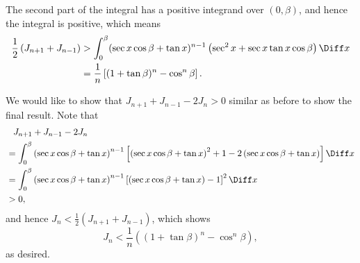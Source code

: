 \begin{enumerate}
          The second part of the integral has a positive integrand over \((0, \beta)\), and hence the integral is positive, which means
          \begin{align*}
              \frac{1}{2} \left(J_{n + 1} + J_{n - 1}\right) & > \int_{0}^{\beta} (\sec x \cos \beta + \tan x)^{n - 1} \left(\sec^2 x + \sec x \tan x \cos \beta\right) \Diff x \\
                                                             & = \frac{1}{n} \left[(1 + \tan \beta)^n - \cos^n \beta\right].
          \end{align*}

          We would like to show that \(J_{n + 1} + J_{n - 1} - 2 J_{n} > 0\) similar as before to show the final result. Note that
          \begin{align*}
               & \phantom{=} J_{n + 1} + J_{n - 1} - 2 J_{n}                                                                                                                                       \\
               & = \int_{0}^{\beta} \left(\sec x \cos \beta + \tan x\right)^{n - 1} \left[\left(\sec x \cos \beta + \tan x\right)^2 + 1 - 2 \left(\sec x \cos \beta + \tan x\right)\right] \Diff x \\
               & = \int_{0}^{\beta} \left(\sec x \cos \beta + \tan x\right)^{n - 1} \left[(\sec x \cos \beta + \tan x) - 1\right]^2 \Diff x                                                        \\
               & > 0,
          \end{align*}
          and hence \(J_{n} < \frac{1}{2} \left(J_{n + 1} + J_{n - 1}\right)\), which shows
          \[
              J_{n} < \frac{1}{n} \left((1 + \tan \beta)^{n} - \cos^{n} \beta\right),
          \]
          as desired.
\end{enumerate}